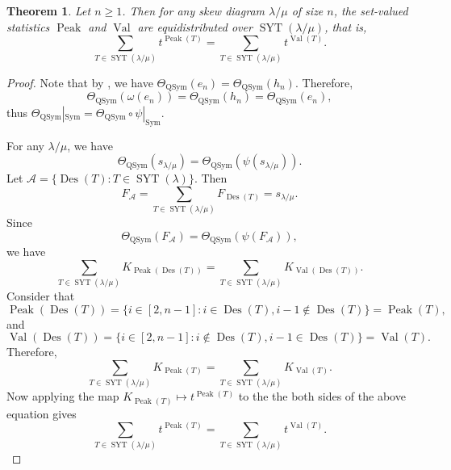 \documentclass[12pt]{amsart}
\newtheorem{theorem}{Theorem}[section]
\numberwithin{equation}{section}
\newcommand{\QSym}{\mathrm{QSym}}
\newcommand{\Sym}{\mathrm{Sym}}
\begin{document}
\begin{theorem}\label{thm:main}{\rm \cite[Theorem 1.1]{Z24}} 
Let $n\geq 1$. Then for any skew diagram $\lambda/\mu$ of size $n$, the set-valued statistics $\operatorname{Peak}$ and $\operatorname{Val}$ are equidistributed over $\operatorname{SYT}(\lambda/\mu)$, that is, 
$$\sum_{T\in \operatorname{SYT}(\lambda/\mu)}t^{\operatorname{Peak}(T)}=\sum_{T\in \operatorname{SYT}(\lambda/\mu)}t^{ \operatorname{Val}(T)}.$$
\end{theorem}
\begin{proof} Note that by \cite[Chapter III, Section 8, Example 10]{M95}, we have $\Theta_{\QSym}(e_n)=\Theta_{\QSym}(h_n).$ Therefore, $$\Theta_{\QSym} (\omega(e_n))=\Theta_{\QSym}(h_n)=\Theta_{\QSym}(e_n),$$ thus $\Theta_{\QSym}|_{\Sym}=\Theta_{\QSym}\circ \psi|_{\Sym}.$

For any $\lambda/\mu$, we have 
 $$\Theta_{\QSym}(s_{\lambda/\mu})=\Theta_{\QSym}(\psi(s_{\lambda/\mu})).$$ Let  $\mathcal{A} = \{\operatorname{Des}(T) : T \in \operatorname{SYT}(\lambda)\}$. Then 
\[
F_{\mathcal{A}} = \sum_{T \in \operatorname{SYT}(\lambda/\mu)} F_{\operatorname{Des}(T)} = s_{\lambda/\mu}.
\]
Since 
$$\Theta_{\QSym}(F_{\mathcal{A}}) = \Theta_{\QSym}(\psi(F_{\mathcal{A}})),$$ we have 
$$\sum_{T \in \operatorname{SYT}(\lambda/\mu)} K_{\operatorname{Peak}(\operatorname{Des}(T))}=\sum_{T \in \operatorname{SYT}(\lambda/\mu)} K_{\operatorname{Val}(\operatorname{Des}(T))}.$$
Consider that $$\operatorname{Peak}(\operatorname{Des}(T))=\{i\in[2,n-1]: i\in \operatorname{Des}(T),i-1\not\in \operatorname{Des}(T) \}=\operatorname{Peak}(T),$$ and 
$$\operatorname{Val}(\operatorname{Des}(T))=\{i\in[2,n-1]: i\not\in \operatorname{Des}(T),i-1\in \operatorname{Des}(T) \}=\operatorname{Val}(T).$$ Therefore, 
$$\sum_{T \in \operatorname{SYT}(\lambda/\mu)} K_{\operatorname{Peak}(T)}=\sum_{T \in \operatorname{SYT}(\lambda/\mu)} K_{\operatorname{Val}(T)}.$$
Now applying the map $K_{\operatorname{Peak}(T)}\mapsto t^{{\operatorname{Peak}(T)}}$ to the the both sides of the above equation gives 
$$\sum_{T\in \operatorname{SYT}(\lambda/\mu)}t^{\operatorname{Peak}(T)}=\sum_{T\in \operatorname{SYT}(\lambda/\mu)}t^{ \operatorname{Val}(T)}.$$
%
%
\end{proof}
\end{document}
